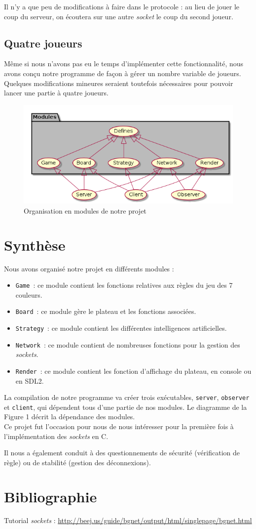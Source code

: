 \documentclass[12pt]{article}
\def\question#1{\subsection{#1}}
\def\sec#1{\section{#1}}
\begin{document}
Il n'y a que peu de modifications à faire dans le protocole : au lieu de jouer le coup du serveur, on écoutera sur une autre \textit{socket} le coup du second joueur.


\question{Quatre joueurs}

Même si nous n'avons pas eu le temps d'implémenter cette fonctionnalité, nous avons conçu notre programme de façon à gérer un nombre variable de joueurs. Quelques modifications mineures seraient toutefois nécessaires pour pouvoir lancer une partie à quatre joueurs.




\begin{figure}
\begin{center}
\includegraphics[scale=0.4]{diagramme.png}
\caption{Organisation en modules de notre projet}
\end{center}
\end{figure}


\sec{Synthèse}


Nous avons organisé notre projet en différents modules : 
\begin{itemize}
\item \texttt{Game}\ : ce module contient les fonctions relatives aux règles du jeu des 7 couleurs.
\item \texttt{Board}\ : ce module gère le plateau et les fonctions associées. 
\item \texttt{Strategy}\ : ce module contient les différentes intelligences artificielles. 
\item \texttt{Network}\ : ce module contient de nombreuses fonctions pour la gestion des \textit{sockets}.
\item \texttt{Render}\ : ce module contient les fonction d'affichage du plateau, en console ou en SDL2.
\end{itemize}

La compilation de notre programme va créer trois exécutables, \texttt{server}, \texttt{observer} et \texttt{client}, qui dépendent tous d'une partie de nos modules. Le diagramme de la Figure 1 décrit la dépendance des modules. \\

Ce projet fut l'occasion pour nous de nous intéresser pour la première fois à l'implémentation des \textit{sockets} en C.

Il nous a également conduit à des questionnements de sécurité (vérification de règle) ou de stabilité (gestion des déconnexions).

\sec{Bibliographie}
Tutorial \textit{sockets} : \url{http://beej.us/guide/bgnet/output/html/singlepage/bgnet.html}
\end{document}
